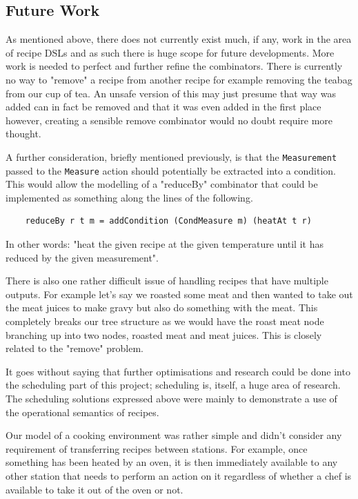 \documentclass[11pt]{article}
\begin{document}
\subsection{Future Work}

As mentioned above, there does not currently exist much, if any, work in the area of
recipe DSLs and as such there is huge scope for future developments. More work is needed
to perfect and further refine the combinators. There is currently no way to
"remove" a recipe from another recipe for example removing the teabag from our cup of tea.
An unsafe version of this may just presume that way was added can in fact be removed
and that it was even added in the first place however, creating a sensible remove
combinator would no doubt require more thought.

\medbreak

A further consideration, briefly mentioned previously, is that the \texttt{Measurement}
passed to the \texttt{Measure} action should potentially be extracted into a condition.
This would allow the modelling of a "reduceBy" combinator that could be implemented as
something along the lines of the following.

\begin{lstlisting}
    reduceBy r t m = addCondition (CondMeasure m) (heatAt t r)
\end{lstlisting}

In other words: "heat the given recipe at the given temperature until it has reduced by the given measurement".

\medbreak

There is also one rather difficult issue of handling recipes that have multiple
outputs. For example let's say we roasted some meat and then wanted to take out the
meat juices to make gravy but also do something with the meat. This completely breaks
our tree structure as we would have the roast meat node branching up into two nodes,
roasted meat and meat juices. This is closely related to the "remove" problem.

\medbreak

It goes without saying that further optimisations and research could be done into the
scheduling part of this project; scheduling is, itself, a huge area of research.
The scheduling solutions expressed above were mainly to demonstrate a use of
the operational semantics of recipes.

\medbreak

Our model of a cooking environment was rather simple and didn't consider any requirement
of transferring recipes between stations. For example, once something has been heated
by an oven, it is then immediately available to any other station that needs to perform
an action on it regardless of whether a chef is available to take it out of the oven or not.
\end{document}
